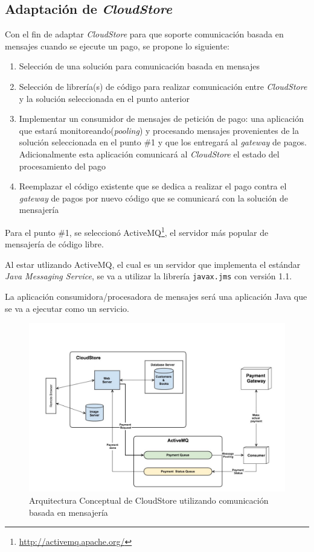 \documentclass[11pt, twoside]{report}
\begin{document}
\subsection{Adaptación de \emph{CloudStore}}
Con el fin de adaptar \emph{CloudStore} para que soporte comunicación basada en mensajes cuando se ejecute un pago, se propone lo siguiente:
\begin{enumerate}
    \item Selección de una solución para comunicación basada en mensajes
    \item Selección de librería(s) de código para realizar comunicación entre \emph{CloudStore} y la solución seleccionada en el punto anterior
    \item Implementar un consumidor de mensajes de petición de pago: una aplicación que estará monitoreando(\emph{pooling}) y procesando mensajes provenientes de la solución seleccionada en el punto \#1 y que los entregará al \emph{gateway} de pagos. Adicionalmente esta aplicación comunicará al \emph{CloudStore} el estado del procesamiento del pago
    \item Reemplazar el código existente que se dedica a realizar el pago contra el \emph{gateway} de pagos por nuevo código que se comunicará con la solución de mensajería
\end{enumerate}

Para el punto \#1, se seleccionó ActiveMQ\footnote{\url{http://activemq.apache.org/}}, el servidor más popular de mensajería de código libre.
 
Al estar utlizando ActiveMQ, el cual es un servidor que implementa el estándar \emph{Java Messaging Service}, se va a utilizar la librería \texttt{javax.jms} con versión 1.1.

La aplicación consumidora/procesadora de mensajes será una aplicación Java que se va a ejecutar como un servicio. 

\begin{figure}[h]
  \centering
  \includegraphics[width=18cm]{cloudstore-jms}
  \caption{\small{Arquitectura Conceptual de CloudStore utilizando comunicación basada en mensajería}}
  \label{fig:cloudstore-jms}
\end{figure}
\end{document}
